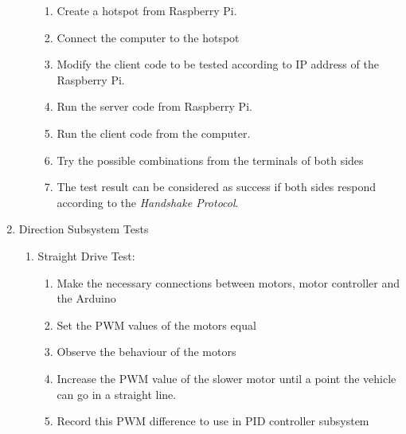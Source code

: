 \documentclass[a4paper,12pt]{article}
\begin{document}
\begin{enumerate}
\begin{enumerate}
\begin{enumerate}

\item Create a hotspot from Raspberry Pi.  

\item Connect the computer to the hotspot  

\item Modify the client code to be tested according to IP address of the Raspberry Pi.  

\item Run the server code from Raspberry Pi.  

\item Run the client code from the computer.  

\item Try the possible combinations from the terminals of both sides  

\item The test result can be considered as success if both sides respond according to the \textit{Handshake Protocol}. 

\end{enumerate}	


\end{enumerate}




\item {Direction Subsystem Tests}

\begin{enumerate}


\item Straight Drive Test: \label{test:a1}	


\begin{enumerate}

\item Make the necessary connections between motors, motor controller and the Arduino  

\item Set the PWM values of the motors equal  

\item Observe the behaviour of the motors  

\item Increase the PWM value of the slower motor until a point the vehicle can go in a straight line.

\item Record this PWM difference to use in PID controller subsystem

\end{enumerate}





\end{enumerate}
\end{enumerate}
\end{document}
